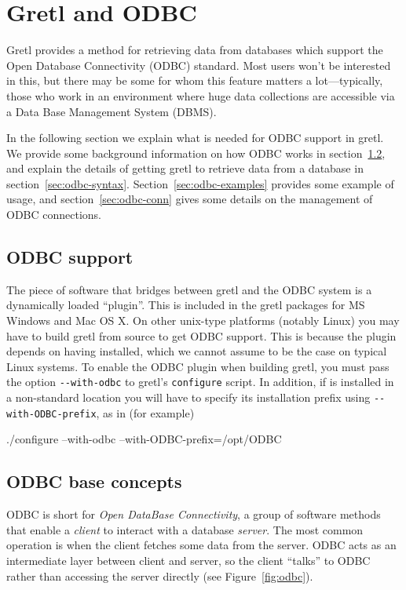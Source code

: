 \chapter{Gretl and ODBC}
\label{chap:odbc}

Gretl provides a method for retrieving data from databases which
support the Open Database Connectivity (ODBC) standard. Most users
won't be interested in this, but there may be some for whom this
feature matters a lot---typically, those who work in an environment
where huge data collections are accessible via a Data Base Management
System (DBMS).

In the following section we explain what is needed for ODBC support in
gretl. We provide some background information on how ODBC works
in section~\ref{sec:odbc-base}, and explain the details of getting
gretl to retrieve data from a database in
section~\ref{sec:odbc-syntax}. Section~\ref{sec:odbc-examples}
provides some example of usage, and section~\ref{sec:odbc-conn} gives
some details on the management of ODBC connections.

\section{ODBC support}
\label{sec:odbc-support}

The piece of software that bridges between gretl and the ODBC system
is a dynamically loaded ``plugin''. This is included in the gretl
packages for MS Windows and Mac OS X. On other unix-type platforms
(notably Linux) you may have to build gretl from source to get ODBC
support.  This is because the plugin depends on having 
installed, which we cannot assume to be the case on typical Linux
systems. To enable the ODBC plugin when building gretl, you must pass
the option \verb|--with-odbc| to gretl's \texttt{configure} script. In
addition, if  is installed in a non-standard location
you will have to specify its installation prefix using
\verb|--with-ODBC-prefix|, as in (for example)
\begin{code}
  ./configure --with-odbc --with-ODBC-prefix=/opt/ODBC
\end{code}

\section{ODBC base concepts}
\label{sec:odbc-base}

ODBC is short for \emph{Open DataBase Connectivity}, a group of
software methods that enable a \emph{client} to interact with a
database \emph{server}. The most common operation is when the client
fetches some data from the server. ODBC acts as an intermediate layer
between client and server, so the client ``talks'' to ODBC rather than
accessing the server directly (see Figure~\ref{fig:odbc}).

